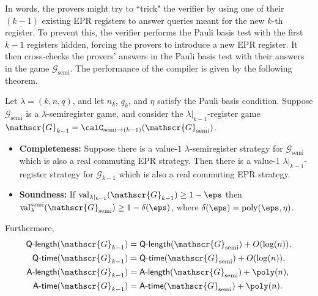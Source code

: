 \documentclass[11pt]{article}
\newcommand{\shorten}[2]{#1|_{#2}}
\newcommand{\register}{\lambda}
\newcommand{\game}{\mathscr{G}}
\newcommand{\valreg}[2]{\mathrm{val}_{#1}(#2)}
\newcommand{\valsemi}[2]{\mathrm{val}_{#1}^{\mathrm{semi}}(#2)}
\newcommand{\qtime}[1]{\mathsf{Q}\textnormal{-}\mathsf{time}(#1)}
\newcommand{\atime}[1]{\mathsf{A}\textnormal{-}\mathsf{time}(#1)}
\newcommand{\qlength}[1]{\mathsf{Q}\textnormal{-}\mathsf{length}(#1)}
\newcommand{\alength}[1]{\mathsf{A}\textnormal{-}\mathsf{length}(#1)}
\begin{document}
In words, the provers might try to ``trick" the verifier by using one of their $(k-1)$ existing EPR registers to answer queries meant for the new $k$-th register.
To prevent this, the verifier performs the Pauli basis test with the first $k-1$ registers hidden, forcing the provers to introduce a new EPR register.
It then cross-checks the provers' answers in the Pauli basis test with their answers in the game $\game_{\mathrm{semi}}$.
The performance of the compiler is given by the following theorem.

\begin{theorem}\label{theorem:one-to-zero-compiler}
Let $\register = (k, n, q)$, and let $n_k$, $q_k$, and $\eta$ satisfy the Pauli basis condition.
Suppose $\game_{\mathrm{semi}}$ is a $\register$-semiregister game,
and consider the $\shorten{\register}{k-1}$-register game $\game_{k-1} = \calC_{\mathrm{semi} \rightarrow (k-1)}(\game_{\mathrm{semi}})$.
\begin{itemize}
\item[$\circ$] \textbf{Completeness:} Suppose there is a value-$1$ $\register$-semiregister strategy for $\game_{\mathrm{semi}}$ which is also a real commuting EPR strategy.
	Then there is a value-$1$ $\shorten{\register}{k-1}$-register strategy for $\game_{k-1}$ which is also a real commuting EPR strategy.
\item[$\circ$] \textbf{Soundness:} If $\valreg{\shorten{\register}{k-1}}{\game_{k-1}}\geq 1-\eps$ then $\valsemi{\register}{\game_{\mathrm{semi}}} \geq 1 -\delta(\eps)$, where $\delta(\eps) = \mathrm{poly}(\eps, \eta)$.
\end{itemize}
Furthermore,
\begin{align*}
\qlength{\game_{k-1}} &= \qlength{\game_{\mathrm{semi}}} + O(\log(n)),  \\
\qtime{\game_{k-1}} &= \qtime{\game_{\mathrm{semi}}} + O(\log(n)), \\
\alength{\game_{k-1}} &= \alength{\game_{\mathrm{semi}}} + \poly(n),\\
\atime{\game_{k-1}} &= \atime{\game_{\mathrm{semi}}} + \poly(n).
\end{align*}
\end{theorem}
\end{document}
